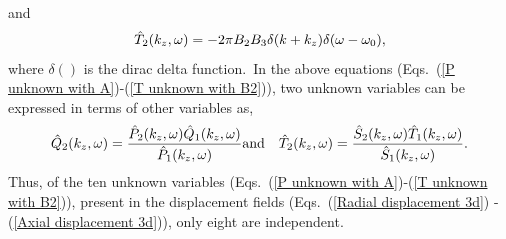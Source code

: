 \documentclass[11pt,cleanfoot]{asme2ej}
\begin{document}
and
\begin{align}\label{T unknown with B2}
    \Hat{T}_2(k_z,\omega) = -2\pi B_2 B_3\delta(k+k_z)\delta(\omega-\omega_0),
\end{align}
where $\delta()$ is the dirac delta function.~In the above equations (Eqs.~(\ref{P unknown with A})-(\ref{T unknown with B2})), two unknown variables can be expressed in terms of other variables as,
\begin{equation}\label{relation between constants}
    \Hat{Q}_2(k_z,\omega) = \frac{\Hat{P}_2(k_z,\omega) \Hat{Q}_1(k_z,\omega)}{\Hat{P}_1(k_z,\omega)}\\ \text{and}\quad\Hat{T}_2(k_z,\omega) = \frac{\Hat{S}_2(k_z,\omega) \Hat{T}_1(k_z,\omega)}{\Hat{S}_1(k_z,\omega)}.
\end{equation}
Thus, of the ten unknown variables (Eqs.~(\ref{P unknown with A})-(\ref{T unknown with B2})), present in the displacement fields (Eqs.~(\ref{Radial displacement 3d}) - (\ref{Axial displacement 3d})), only eight are independent.
\end{document}
